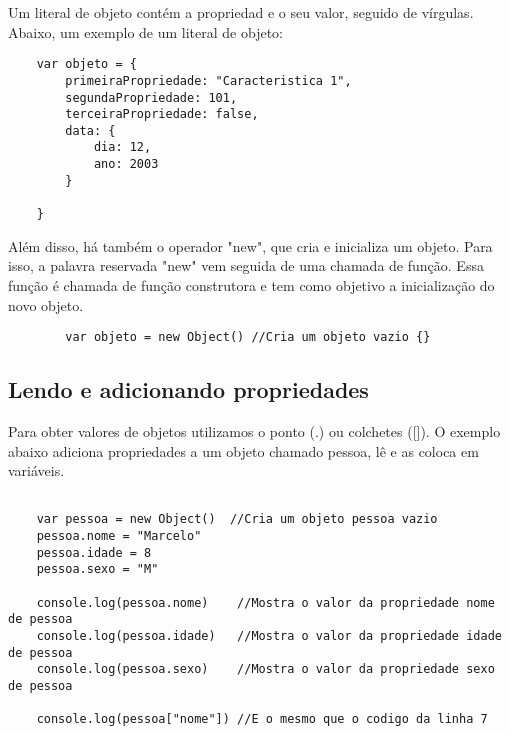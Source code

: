 	Um literal de objeto contém a propriedad e o seu valor, seguido de vírgulas. Abaixo, um exemplo de um literal de objeto: \newline \newline
   \begin{lstlisting}
    var objeto = {
    	primeiraPropriedade: "Caracteristica 1",
    	segundaPropriedade: 101,
    	terceiraPropriedade: false,
    	data: {
    		dia: 12,
    		ano: 2003
    	}
    
    }
    \end{lstlisting}

	Além disso, há também o operador "new", que cria e inicializa um objeto. Para isso, a palavra reservada "new" vem seguida de uma chamada de função. Essa função é chamada de função construtora e tem como objetivo a inicialização do novo objeto.
	
	\begin{lstlisting}
		var objeto = new Object() //Cria um objeto vazio {}
	\end{lstlisting}
	
	\subsection{Lendo e adicionando propriedades}
	Para obter valores de objetos utilizamos o ponto (.) ou colchetes ([]). O exemplo abaixo adiciona propriedades a um objeto chamado pessoa, lê e as coloca em variáveis.
	\newline
	\newline
	\begin{lstlisting}
	
	var pessoa = new Object()  //Cria um objeto pessoa vazio
	pessoa.nome = "Marcelo"
	pessoa.idade = 8
	pessoa.sexo = "M"
	
	console.log(pessoa.nome)	//Mostra o valor da propriedade nome de pessoa
	console.log(pessoa.idade)	//Mostra o valor da propriedade idade de pessoa
	console.log(pessoa.sexo) 	//Mostra o valor da propriedade sexo de pessoa

	console.log(pessoa["nome"]) //E o mesmo que o codigo da linha 7
	\end{lstlisting}
